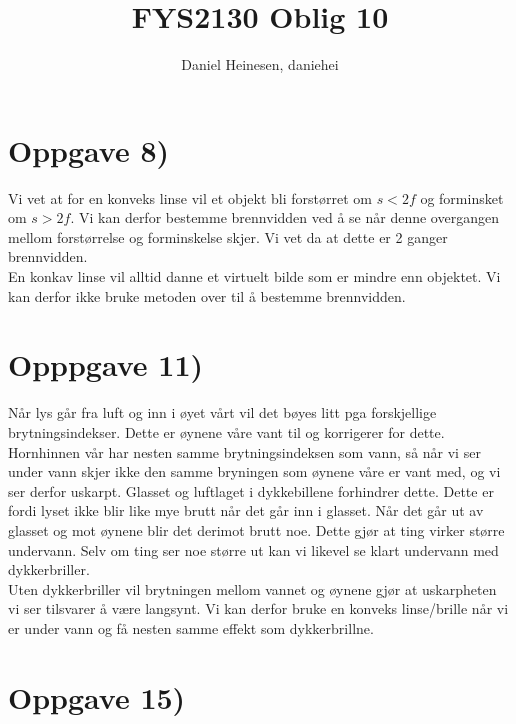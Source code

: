 \documentclass[a4paper,norsk, 10pt]{article}
\title{FYS2130 Oblig 10}
\author{Daniel Heinesen, daniehei}
\begin{document}
\maketitle


\section*{Oppgave 8)}

Vi vet at for en konveks linse vil et objekt bli forstørret om $s < 2f$ og forminsket om $s>2f$. Vi kan derfor bestemme brennvidden ved å se når denne overgangen mellom forstørrelse og forminskelse skjer. Vi vet da at dette er 2 ganger brennvidden.\\

En konkav linse vil alltid danne et virtuelt bilde som er mindre enn objektet. Vi kan derfor ikke bruke metoden over til å bestemme brennvidden.

\section*{Opppgave 11)}

Når lys går fra luft og inn i øyet vårt vil det bøyes litt pga forskjellige brytningsindekser. Dette er øynene våre vant til og korrigerer for dette. Hornhinnen vår har nesten samme brytningsindeksen som vann, så når vi ser under vann skjer ikke den samme bryningen som øynene våre er vant med, og vi ser derfor uskarpt. Glasset og luftlaget i dykkebillene forhindrer dette. Dette er fordi lyset ikke blir like mye brutt når det går inn i glasset. Når det går ut av glasset og mot øynene blir det derimot brutt noe. Dette gjør at ting virker større undervann. Selv om ting ser noe større ut kan vi likevel se klart undervann med dykkerbriller.\\

Uten dykkerbriller vil brytningen mellom vannet og øynene gjør at uskarpheten vi ser tilsvarer å være langsynt. Vi kan derfor bruke en konveks linse/brille når vi er under vann og få nesten samme effekt som dykkerbrillne.

\section*{Oppgave 15)}
\end{document}
